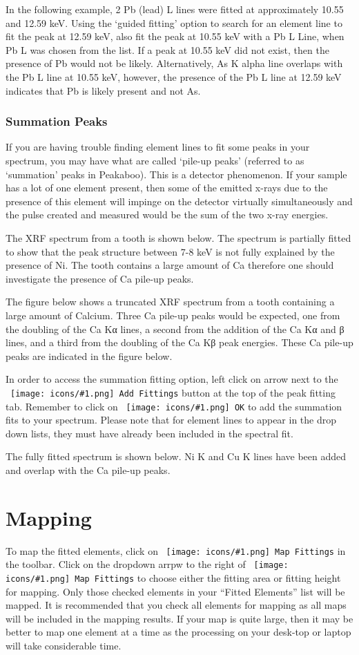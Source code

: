 \documentclass[article,11pt]{report}
\newcommand{\command}[1]{\texttt{#1}}
\newcommand{\icon}[1]{\texttt{[image: icons/\#1.png]}}
\newcommand{\button}[2]{\ \command{\mbox{\icon{#1} #2}}}
\newcommand{\tocchapter}[1]{\chapter*{#1}\addcontentsline{toc}{chapter}{#1}}
\newcommand{\tocsubsection}[1]{\subsection*{#1}\addcontentsline{toc}{subsection}{#1}}
\begin{document}
In the following example, 2 Pb (lead) L lines were fitted at approximately 10.55 and
12.59 keV. Using the ‘guided fitting’ option to search for an element line to fit the
peak at 12.59 keV, also fit the peak at 10.55 keV with a Pb L Line, when Pb L was
chosen from the list. If a peak at 10.55 keV did not exist, then the presence of Pb
would not be likely. Alternatively, As K alpha line overlaps with the Pb L line at
10.55 keV, however, the presence of the Pb L line at 12.59 keV indicates that Pb is
likely present and not As.

\tocsubsection{Summation Peaks}

If you are having trouble finding element lines to fit some peaks in your spectrum,
you may have what are called ‘pile-up peaks’ (referred to as ‘summation’ peaks in
Peakaboo). This is a detector phenomenon. If your sample has a lot of one element
present, then some of the emitted x-rays due to the presence of this element will
impinge on the detector virtually simultaneously and the pulse created and
measured would be the sum of the two x-ray energies.

The XRF spectrum from a tooth is shown below. The spectrum is partially fitted to
show that the peak structure between 7-8 keV is not fully explained by the
presence of Ni. The tooth contains a large amount of Ca therefore one should
investigate the presence of Ca pile-up peaks.

The figure below shows a truncated XRF spectrum from a tooth containing a large
amount of Calcium. Three Ca pile-up peaks would be expected, one from the
doubling of the Ca Kα lines, a second from the addition of the Ca Kα and β lines,
and a third from the doubling of the Ca Kβ peak energies. These Ca pile-up peaks
are indicated in the figure below.

In order to access the summation fitting option, left click on arrow next to the
\button{edit-add}{Add Fittings} button at the top of the peak fitting tab. Remember 
to click on \button{choose-ok}{OK} to add the summation fits to your spectrum. 
Please note that for element lines to appear in the drop down lists, they must 
have already been included in the spectral fit.

The fully fitted spectrum is shown below. Ni K and Cu K lines have been added and
overlap with the Ca pile-up peaks.



\tocchapter{Mapping}

To map the fitted elements, click on \button{map}{Map Fittings} in the toolbar. 
Click on the dropdown arrpw to the right of \button{map}{Map Fittings} to choose either the
fitting area or fitting height for mapping. Only those checked elements in your
``Fitted Elements'' list will be mapped. It is recommended that you check all
elements for mapping as all maps will be included in the mapping results. If your
map is quite large, then it may be better to map one element at a time as the
processing on your desk-top or laptop will take considerable time.
\end{document}
